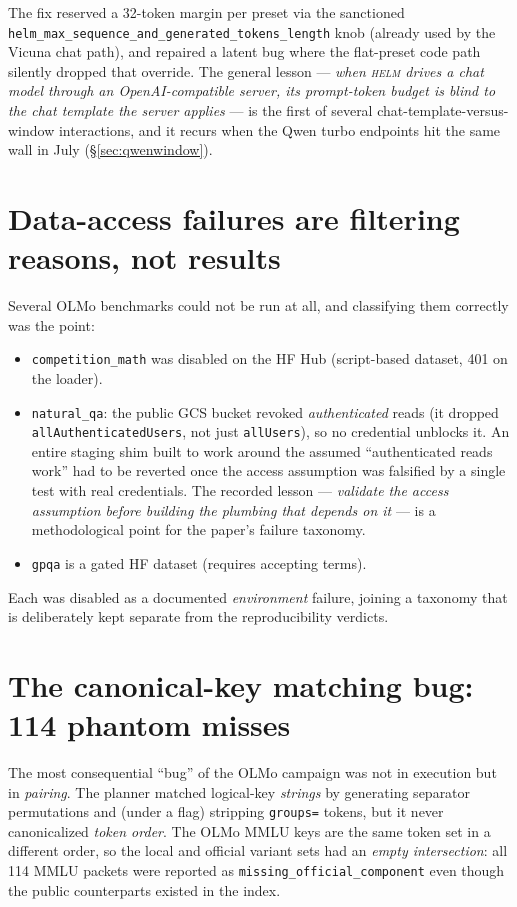 \documentclass[11pt]{report}
\newcommand{\code}[1]{\texttt{#1}}
\begin{document}
The fix reserved a 32-token margin per preset via the sanctioned
\code{helm\_max\_sequence\_and\_generated\_tokens\_length} knob (already used by the
Vicuna chat path), and repaired a latent bug where the flat-preset code path
silently dropped that override. The general lesson --- \emph{when \textsc{helm}
drives a chat model through an OpenAI-compatible server, its prompt-token budget is
blind to the chat template the server applies} --- is the first of several
chat-template-versus-window interactions, and it recurs when the Qwen turbo
endpoints hit the same wall in July (\S\ref{sec:qwenwindow}).

\section{Data-access failures are filtering reasons, not results}

Several OLMo benchmarks could not be run at all, and classifying them correctly was
the point:

\begin{itemize}[nosep]
  \item \code{competition\_math} was disabled on the HF Hub (script-based dataset,
        401 on the loader).
  \item \code{natural\_qa}: the public GCS bucket revoked \emph{authenticated}
        reads (it dropped \code{allAuthenticatedUsers}, not just \code{allUsers}),
        so no credential unblocks it. An entire staging shim built to work around
        the assumed ``authenticated reads work'' had to be reverted once the
        access assumption was falsified by a single test with real credentials.
        The recorded lesson --- \emph{validate the access assumption before
        building the plumbing that depends on it} --- is a methodological point for
        the paper's failure taxonomy.
  \item \code{gpqa} is a gated HF dataset (requires accepting terms).
\end{itemize}

Each was disabled as a documented \emph{environment} failure, joining a taxonomy
that is deliberately kept separate from the reproducibility verdicts.

\section{The canonical-key matching bug: 114 phantom misses}
\label{sec:canonkey}

The most consequential ``bug'' of the OLMo campaign was not in execution but in
\emph{pairing}. The planner matched logical-key \emph{strings} by generating
separator permutations and (under a flag) stripping \code{groups=} tokens, but it
never canonicalized \emph{token order}. The OLMo MMLU keys are the same token set
in a different order, so the local and official variant sets had an \emph{empty
intersection}: all 114 MMLU packets were reported as
\code{missing\_official\_component} even though the public counterparts existed in
the index.
\end{document}
